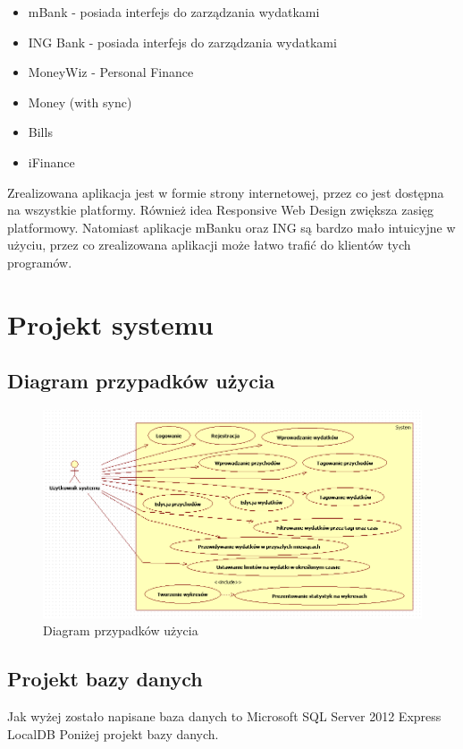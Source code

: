 \documentclass[10pt,titlepage]{article}
\begin{document}
\begin{itemize}
  \item mBank - posiada interfejs do zarządzania wydatkami
  \item ING Bank - posiada interfejs do zarządzania wydatkami
  \item MoneyWiz - Personal Finance
  \item Money (with sync)
  \item Bills
  \item iFinance
\end{itemize}
\par Zrealizowana aplikacja jest w formie strony internetowej, przez co jest dostępna na wszystkie platformy. Również idea Responsive Web Design zwiększa zasięg platformowy. Natomiast aplikacje mBanku oraz ING są bardzo mało intuicyjne w użyciu, przez co zrealizowana aplikacji może łatwo trafić do klientów tych programów.
\section{Projekt systemu}
\subsection{Diagram przypadków użycia}
\begin{figure}[H]
  \centering
  \includegraphics[scale=0.7]{images/use_case.png}
  \caption{Diagram przypadków użycia}
\end{figure}
\subsection{Projekt bazy danych}
Jak wyżej zostało napisane baza danych to Microsoft SQL Server 2012 Express LocalDB
Poniżej projekt bazy danych.
\end{document}
